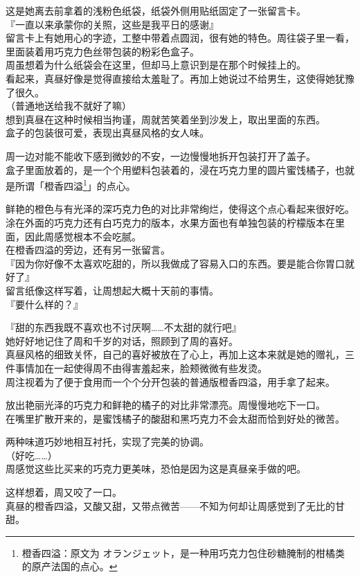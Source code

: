 这是她离去前拿着的浅粉色纸袋，纸袋外侧用贴纸固定了一张留言卡。\\

『一直以来承蒙你的关照，这些是我平日的感谢』\\

留言卡上有她用心的字迹，工整中带着点圆润，很有她的特色。周往袋子里一看，里面装着用巧克力色丝带包装的粉彩色盒子。\\

周虽想着为什么纸袋会在这里，但却马上意识到是在那个时候挂上的。\\

看起来，真昼好像是觉得直接给太羞耻了。再加上她说过不给男生，这使得她犹豫了很久。\\

（普通地送给我不就好了嘛）\\

想到真昼在这种时候相当拘谨，周就苦笑着坐到沙发上，取出里面的东西。\\

盒子的包装很可爱，表现出真昼风格的女人味。

周一边对能不能收下感到微妙的不安，一边慢慢地拆开包装打开了盖子。\\

盒子里面放着的，是一个个用塑料包装着的，浸在巧克力里的圆片蜜饯橘子，也就是所谓「橙香四溢\footnote{橙香四溢：原文为 {\jpfont オランジェット}，是一种用巧克力包住砂糖腌制的柑橘类的原产法国的点心。}」的点心。

鲜艳的橙色与有光泽的深巧克力色的对比非常绚烂，使得这个点心看起来很好吃。\\

涂在外面的巧克力还有白巧克力的版本，水果方面也有单独包装的柠檬版本在里面，因此周感觉根本不会吃腻。\\

在橙香四溢的旁边，还有另一张留言。\\

『因为你好像不太喜欢吃甜的，所以我做成了容易入口的东西。要是能合你胃口就好了』\\

留言纸像这样写着，让周想起大概十天前的事情。\\

『要什么样的？』

『甜的东西我既不喜欢也不讨厌啊……不太甜的就行吧』\\

她好好地记住了周和千岁的对话，照顾到了周的喜好。\\

真昼风格的细致关怀，自己的喜好被放在了心上，再加上这本来就是她的赠礼，三件事情加在一起使得周不由得害羞起来，脸颊微微有些发烫。\\

周注视着为了便于食用而一个个分开包装的普通版橙香四溢，用手拿了起来。

放出艳丽光泽的巧克力和鲜艳的橘子的对比非常漂亮。周慢慢地吃下一口。\\

在嘴里扩散开来的，是蜜饯橘子的酸甜和黑巧克力不会太甜而恰到好处的微苦。

两种味道巧妙地相互衬托，实现了完美的协调。\\

（好吃……）\\

周感觉这些比买来的巧克力更美味，恐怕是因为这是真昼亲手做的吧。

这样想着，周又咬了一口。\\

真昼的橙香四溢，又酸又甜，又带点微苦——不知为何却让周感觉到了无比的甘甜。
